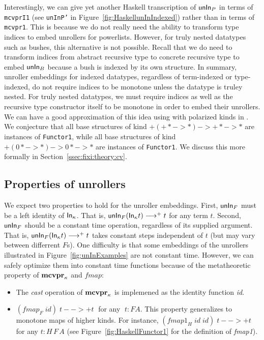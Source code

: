 Interestingly, we can give yet another
Haskell transcription of $\mathsf{unIn}_P$ in terms of \texttt{mcvprI1}
(see \texttt{unInP'} in Figure~\ref{fig:HaskellunInIndexed})
rather than in terms of \texttt{mcvpr1}. This is because we do not
really need the ability to transform type indices to embed unrollers
for powerlists. However, for truly nested datatypes such as bushes,
this alternative is not possible. Recall that we do need to
transform indices from abstract recursive type to concrete recursive type
to embed $\mathsf{unIn}_B$ because a bush is indexed by its own structure.
In summary, unroller embeddings for indexed datatypes, regardless of
term-indexed or type-indexed, do not require indices to be monotone
unless the datatype is truley nested. For truly nested datatypes,
we must require indices as well as the recursive type constructor itself
to be monotone in order to embed their unrollers. We can have
a good approximation of this idea using with polarized kinds in \Fixi.
We conjecture that all base structures of kind $+(+* -> *) -> +* -> *$
are instances of \texttt{Functor1}, while all base structures of kind
$+(0* -> *) -> 0* -> *$ are instances of \texttt{Functor1}. We discuss this
more formally in Section~\ref{ssec:fixi:theory:cv}.

\subsection{Properties of unrollers}
We expect two properties to hold for the unroller embeddings.
First, $\mathsf{unIn}_F$ must be a left identity of $\mathsf{In}_\kappa$.
That is, $\mathsf{unIn}_F(\mathsf{In}_\kappa t) -->+ t$ for any term $t$.
Second, $\mathsf{unIn}_F$ should be a constant time operation, regardless of its
supplied argument. That is, $\mathsf{unIn}_F(\mathsf{In}_\kappa t) -->+ t$ takes
constant steps independent of $t$ (but may vary between differrent $F$s).
One difficulty is that some embeddings of the unrollers illustrated in
Figure~\ref{fig:unInExamples} are not constant time. However, we can
safely optimize them into constant time functions because of
the metatheoretic property of $\mathbf{mcvpr}_\kappa$ and $\textit{fmap}$:
\begin{itemize}
\item The \textit{cast} operation of $\mathbf{mcvpr}_\kappa$
	is implemened as the identity function \textit{id}.
\item $(\textit{fmap}_F\;\textit{id})\;t -->+ t\;$ for any $\;t : F A$.
	This property generalizes to monotone maps of higher kinds.
	For instance,
      $(\textit{fmap1}_H\;\textit{id}\;\textit{id})\;t -->+ t$
      for any $t : H\,F\,A$ (see Figure~\ref{fig:HaskellFunctor1}
      for the definition of \textit{fmap1}).
\end{itemize}

